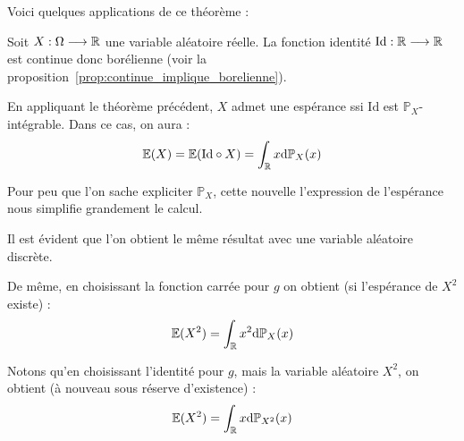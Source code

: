 \documentclass[../integ-proba.tex]{subfiles}
\begin{document}
    Voici quelques applications de ce théorème :

    \begin{exemple}
        Soit $X:\Omega \longrightarrow \mathbb{R}$ une variable aléatoire réelle.
        La fonction identité $\text{Id}:\mathbb{R} \longrightarrow \mathbb{R}$ est continue donc borélienne (voir la proposition~\ref{prop:continue_implique_borelienne}).

        En appliquant le théorème précédent, $X$ admet une espérance ssi $\text{Id}$ est $\mathbb{P}_X$-intégrable.
        Dans ce cas, on aura :
        \begin{displaymath}
            \mathbb{E}(X) = \mathbb{E}(\text{Id} \circ X) = \int_{\mathbb{R}} x\textnormal{d}\mathbb{P}_X(x)
        \end{displaymath}

        Pour peu que l'on sache expliciter $\mathbb{P}_X$, cette nouvelle l'expression de l'espérance nous simplifie grandement le calcul.

        Il est évident que l'on obtient le même résultat avec une variable aléatoire discrète.
    \end{exemple}

    \begin{exemple}
        De même, en choisissant la fonction carrée pour $g$ on obtient (si l'espérance de $X^2$ existe) :
        \begin{displaymath}
            \mathbb{E}(X^2) = \int_{\mathbb{R}} x^2\textnormal{d}\mathbb{P}_X(x)
        \end{displaymath}

        Notons qu'en choisissant l'identité pour $g$, mais la variable aléatoire $X^2$, on obtient (à nouveau sous réserve d'existence) :
        \begin{displaymath}
            \mathbb{E}(X^2) = \int_\mathbb{R} x\textnormal{d}\mathbb{P}_{X^2}(x)
        \end{displaymath}
    \end{exemple}
\end{document}
